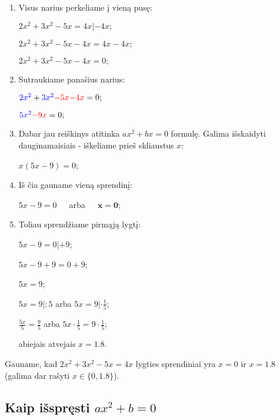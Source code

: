 \documentclass[a4paper]{article}
\begin{document}
\begin{enumerate}
      \item Visus narius perkeliame į vieną pusę:

            $ 2x^2 + 3x^2 - 5x = 4x | - 4x; $

            $ 2x^2 + 3x^2 - 5x - 4x = 4x - 4x; $

            $ 2x^2 + 3x^2 - 5x - 4x = 0; $

      \item Sutraukiame panašius narius:

            $ \textcolor{blue}{2x^2} + \textcolor{blue}{3x^2} \textcolor{red}{-
                        5x} \textcolor{red}{- 4x} = 0; $

            $ \textcolor{blue}{5x^2} \textcolor{red}{- 9x} = 0; $

      \item Dabar jau reiškinys atitinka $ ax^{2}+ bx = 0 $ formulę. Galima
            išskaidyti dauginamaisiais - iškeliame prieš skliaustus $ x $:

            $ x(5x - 9) = 0 $;

      \item Iš čia gauname vieną sprendinį:

            $ 5x-9 = 0 $ $\;\;\;$ arba $\;\;\;$ $ \boldsymbol{x=0} $;

      \item Toliau sprendžiame pirmąją lygtį:

            $ 5x-9 = 0 | + 9 $;

            $ 5x-9+9 = 0+9 $;

            $ 5x = 9 $;

            $ 5x = 9|:5 $ arba $ 5x = 9|\cdot \frac{1}{5}$;

            $ \frac{5x}{5} = \frac{9}{5} $ arba $ 5x\cdot\frac{1}{5} = 9\cdot
                  \frac{1}{5}$;

            abiejais atvejais $ x = 1.8 $.

\end{enumerate}

Gauname, kad $ 2x^2 + 3x^2 - 5x = 4x $ lygties sprendiniai yra $x=0$ ir $ x =
      1.8 $ (galima dar rašyti $ x \in \{0, 1.8\} $).

\subsection{Kaip išspręsti $ ax^{2}+b=0 $}\label{sec:ax_square_equal_number}
\end{document}
